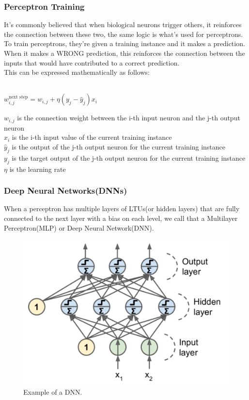 \documentclass[article]{llncs}
\begin{document}
\subsubsection{Perceptron Training} It's commonly believed that when biological neurons trigger others, it reinforces the connection between these two, the same logic is what's used for perceptrons.\\ To train perceptrons, they're given a training instance and it makes a prediction.\\ When it makes a WRONG prediction, this reinforces the connection between the inputs that would have contributed to a correct prediction.\\ This can be expressed mathematically as follows:
\begin{theorem}\\
    $w_{i,j}^{\text{next step}} = w_{i,j} + \eta(y_j - \hat{y}_j)x_i $
\end{theorem}
$w_{i,j}$ is the connection weight between the i-th input neuron and the j-th output neuron\\
$x_i$ is the i-th input value of the current training instance\\
$\hat{y}_j$ is the output of the j-th output neuron for the current training instance\\
$y_j$ is the target output of the j-th output neuron for the current training instance\\
$\eta$ is the learning rate

\subsubsection{Deep Neural Networks(DNNs)} When a perceptron has multiple layers of LTUs(or hidden layers) that are fully connected to the next layer with a bias on each level, we call that a Multilayer Perceptron(MLP) or Deep Neural Network(DNN).
\begin{figure}[H]
\centering
\includegraphics[scale=0.55]{fig3.PNG}
\caption{Example of a DNN.} \label{fig3}
\end{figure}
\end{document}
